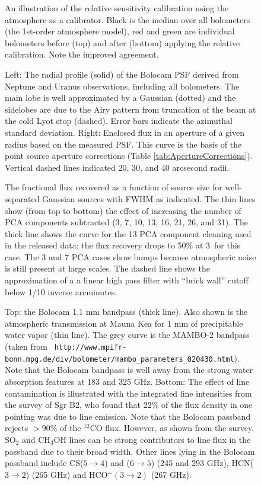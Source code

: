 \documentclass[12pt,preprint]{aastex}
\def\Figure#1#2#3#4{
\begin{figure}[htb]
\epsscale{#4}
\plotone{#1}
\caption{#2}
\label{#3}
\end{figure}
}
\def\FigureTwo#1#2#3#4#5{
\begin{figure}[htb]
\epsscale{#5}
\plottwo{#1}{#2}
\caption{#3}
\label{#4}
\end{figure}
}
\begin{document}
\Figure{f13}{An illustration of the relative sensitivity calibration
using the atmosphere as a calibrator.  Black is the median over all
bolometers (the 1st-order atmosphere model), red and green are
individual bolometers before (top) and after (bottom) applying the
relative calibration.  Note the improved agreement.}
{fig:Flatfield}{1.0}

\FigureTwo{f14a}{f14b}{Left: The radial profile (solid) of the Bolocam
PSF derived from Neptune and Uranus observations, including all
bolometers.  The main lobe is well approximated by a Gaussian (dotted)
and the sidelobes are due to the Airy pattern from truncation of the
beam at the cold Lyot stop (dashed).  Error bars indicate the
azimuthal standard deviation.  Right: Enclosed flux in an aperture of
a given radius based on the measured PSF.  This curve is the basis of
the point source aperture corrections (Table
\ref{tab:ApertureCorrections}).  Vertical dashed lines indicated 20,
30, and 40 arcsecond radii.}{fig:PSF}{1.0}

\Figure{f15} {The fractional flux recovered as a function of
source size for well-separated Gaussian sources with FWHM as
indicated.  The thin lines show (from top to bottom) the effect of
increasing the number of PCA components subtracted (3, 7, 10, 13, 16,
21, 26, and 31).  The thick line shows the curve for the 13 PCA
component cleaning used in the released data; the flux recovery drops
to 50\% at 3\farcm8\ for this case.  The 3 and 7 PCA cases show bumps
because atmospheric noise is still present at large scales.  The
dashed line shows the approximation of a a linear high pass filter
with ``brick wall'' cutoff below 1/10 inverse arcminutes.}
{fig:PCA_Filter}{1.0}

\clearpage

\Figure{f16}%
{Top: the Bolocam 1.1 mm bandpass (thick line).  Also shown is the
atmospheric transmission at Mauna Kea for 1 mm of precipitable water
vapor (thin line).  The grey curve is the MAMBO-2 bandpass (taken from
{\tt
http://www.mpifr-bonn.mpg.de/div/bolometer/mambo\_parameters\_020430.html}).
Note that the Bolocam bandpass is well away from the strong water
absorption features at 183 and 325 GHz.  Bottom: The effect of line
contamination is illustrated with the integrated line intensities from
the \citet{nummelin1998} survey of Sgr B2, who found that 22\% of the
flux density in one pointing was due to line emission.  Note that the
Bolocam passband rejects $>90\%$ of the $^{12}$CO flux.  However, as
shown from the \citet{nummelin1998} survey, SO$_2$ and CH$_3$OH lines
can be strong contributors to line flux in the passband due to their
broad width. Other lines lying in the Bolocam passband include
CS($5\to4$) and ($6\to5$) (245 and 293 GHz), HCN($3\to2$) (265 GHz)
and HCO$^+(3\to2)$ (267 GHz).} {fig:Bandpass}{1.0}
\end{document}
